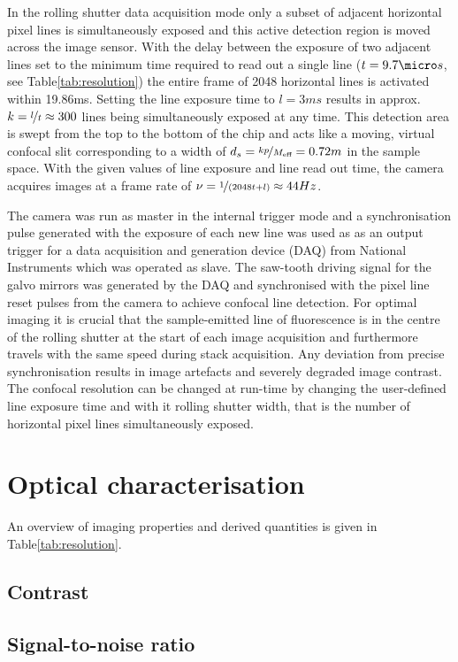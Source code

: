\documentclass[12pt]{spieman}  %
\begin{document}
In the rolling shutter data acquisition mode only a subset of adjacent horizontal pixel lines is simultaneously exposed and this active detection region is moved across the image sensor. With the delay between the exposure of two adjacent lines set to the minimum time required to read out a single line ($t=9.7\micro s$, see Table\ref{tab:resolution}) the entire frame of 2048 horizontal lines is activated within 19.86ms. Setting the line exposure time to $l=3ms$ results in approx. $k=\nicefrac{l}{t}\approx300$  lines being simultaneously exposed at any time. This detection area is swept from the top to the bottom of the chip and acts like a moving, virtual confocal slit corresponding to a width of $d_s=\nicefrac{k p}{M_{\text{eff}}}= 0.72m$ in the sample space. With the given values of line exposure and line read out time, the camera acquires images at a frame rate of $\nu = \nicefrac{1}{(2048t+l)} \approx 44Hz$. 

The camera was run as master in the internal trigger mode and a synchronisation pulse generated with the exposure of each new line was used as as an output trigger for a data acquisition and generation device (DAQ) from National Instruments which was operated as slave. The saw-tooth driving signal for the galvo mirrors was generated by the DAQ and synchronised with the pixel line reset pulses from the camera to achieve confocal line detection\cite{Baumgart2012}. For optimal imaging it is crucial that the sample-emitted line of fluorescence is in the centre of the rolling shutter at the start of each image acquisition and furthermore travels with the same speed during stack acquisition. Any deviation from precise synchronisation results in image artefacts and severely degraded image contrast. The confocal resolution can be changed at run-time by changing the user-defined line exposure time and with it rolling shutter width, that is the number of horizontal pixel lines simultaneously exposed.   
 

\section{Optical characterisation}
An overview of imaging properties and derived quantities is given in Table\ref{tab:resolution}.	


	\subsection{Contrast}
	
	\subsection{Signal-to-noise ratio}
	
\end{document}
